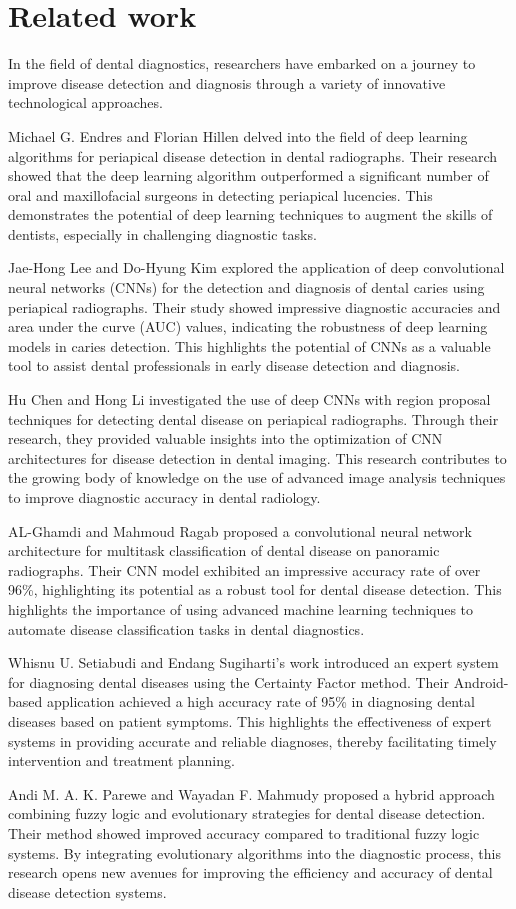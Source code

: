 \section{Related work}

In the field of dental diagnostics, researchers have embarked on a journey to improve disease detection and diagnosis through a variety of innovative technological approaches.

Michael G. Endres and Florian Hillen delved into the field of deep learning algorithms for periapical disease detection in dental radiographs. Their research showed that the deep learning algorithm outperformed a significant number of oral and maxillofacial surgeons in detecting periapical lucencies. This demonstrates the potential of deep learning techniques to augment the skills of dentists, especially in challenging diagnostic tasks.

Jae-Hong Lee and Do-Hyung Kim explored the application of deep convolutional neural networks (CNNs) for the detection and diagnosis of dental caries using periapical radiographs. Their study showed impressive diagnostic accuracies and area under the curve (AUC) values, indicating the robustness of deep learning models in caries detection. This highlights the potential of CNNs as a valuable tool to assist dental professionals in early disease detection and diagnosis.

Hu Chen and Hong Li investigated the use of deep CNNs with region proposal techniques for detecting dental disease on periapical radiographs. Through their research, they provided valuable insights into the optimization of CNN architectures for disease detection in dental imaging. This research contributes to the growing body of knowledge on the use of advanced image analysis techniques to improve diagnostic accuracy in dental radiology.

AL-Ghamdi and Mahmoud Ragab proposed a convolutional neural network architecture for multitask classification of dental disease on panoramic radiographs. Their CNN model exhibited an impressive accuracy rate of over 96\%, highlighting its potential as a robust tool for dental disease detection. This highlights the importance of using advanced machine learning techniques to automate disease classification tasks in dental diagnostics.

Whisnu U. Setiabudi and Endang Sugiharti's work introduced an expert system for diagnosing dental diseases using the Certainty Factor method. Their Android-based application achieved a high accuracy rate of 95\% in diagnosing dental diseases based on patient symptoms. This highlights the effectiveness of expert systems in providing accurate and reliable diagnoses, thereby facilitating timely intervention and treatment planning.

Andi M. A. K. Parewe and Wayadan F. Mahmudy proposed a hybrid approach combining fuzzy logic and evolutionary strategies for dental disease detection. Their method showed improved accuracy compared to traditional fuzzy logic systems. By integrating evolutionary algorithms into the diagnostic process, this research opens new avenues for improving the efficiency and accuracy of dental disease detection systems.